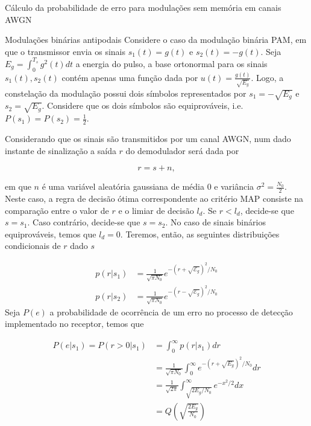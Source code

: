 \documentclass[
  ignorenonframetext,
]{beamer}
\begin{document}
\begin{frame}{Cálculo da probabilidade de erro para modulações sem
memória em canais AWGN}
\label{cuxe1lculo-da-probabilidade-de-erro-para-modulauxe7uxf5es-sem-memuxf3ria-em-canais-awgn}
\begin{block}{Modulações binárias antipodais}
\label{modulauxe7uxf5es-binuxe1rias-antipodais}
Considere o caso da modulação binária PAM, em que o transmissor envia os
sinais \(s_1(t) = g(t)\) e \(s_2(t) = -g(t)\). Seja
\(E_g = \int_{0}^{T_s} g^2(t)dt\) a energia do pulso, a base ortonormal
para os sinais \({s_1(t),s_2(t)}\) contém apenas uma função dada por
\(u(t) = \frac{g(t)}{\sqrt{E_g}}\). Logo, a constelação da modulação
possui dois símbolos representados por \(s_1 = -\sqrt{E_g}\) e
\(s_2 = \sqrt{E_g}\). Considere que os dois símbolos são equiprováveis,
i.e.~\(P(s_1) = P(s_2)= \frac{1}{2}\).

Considerando que os sinais são transmitidos por um canal AWGN, num dado
instante de sinalização a saída \(r\) do demodulador será dada por

\begin{equation}
r = s + n,
\end{equation}

em que \(n\) é uma variável aleatória gaussiana de média 0 e variância
\(\sigma^2 = \frac{N_0}{2}\). Neste caso, a regra de decisão ótima
correspondente ao critério MAP consiste na comparação entre o valor de
\(r\) e o limiar de decisão \(l_d\). Se \(r<l_d\), decide-se que
\(s=s_1\). Caso contrário, decide-se que \(s=s_2\). No caso de sinais
binários equiprováveis, temos que \(l_d = 0\). Teremos, então, as
seguintes distribuições condicionais de \(r\) dado \(s\)

\[
\begin{align}
p\left(r|s_1\right)&=\frac{1}{\sqrt{\pi N_0}} e^{-\left(r+\sqrt{\mathcal{E}_g}\right)^2 / N_0} \nonumber\\
p\left(r|s_2\right)&=\frac{1}{\sqrt{\pi N_0}} e^{-\left(r-\sqrt{\mathcal{E}_g}\right)^2 / N_0} \nonumber
\end{align}
\] Seja \(P(e)\) a probabilidade de ocorrência de um erro no processo de
detecção implementado no receptor, temos que

\[
\begin{align}
P(e|s_1) = P\left(r>0|s_1\right) & =\int_{0}^\infty p\left(r|s_1\right) d r \nonumber\\
& =\frac{1}{\sqrt{\pi N_0}} \int_{0}^\infty e^{-\left(r + \sqrt{E_g}\right)^2 / N_0} d r \nonumber\\
& =\frac{1}{\sqrt{2 \pi}} \int_{\sqrt{2 E_g / N_0}}^{\infty} e^{-x^2 / 2} d x \nonumber\\
& =Q\left(\sqrt{\frac{2 E_g}{N_0}}\right)
\end{align}
\]


\end{block}
\end{frame}
\end{document}
